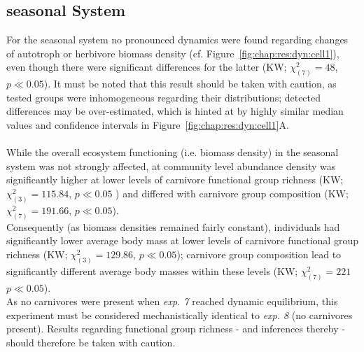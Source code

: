 \subsection{seasonal System}
\label{chap:res:popind:cell1}
 For the seasonal system no pronounced dynamics were found regarding changes of autotroph or herbivore biomass density (cf. Figure~\ref{fig:chap:res:dyn:cell1}), even though there were significant differences for the latter (KW; $\chi^{2}_{(7)} = 48$, $p \ll 0.05$). It must be noted that this result should be taken with caution, as tested groups were inhomogeneous regarding their distributions; detected differences may be over-estimated, which is hinted at by highly similar median values and confidence intervals in Figure~\ref{fig:chap:res:dyn:cell1}A.
\\\\
While the overall ecosystem functioning (i.e. biomass density) in the seasonal system was not strongly affected, at community level abundance density was significantly higher at lower levels of carnivore functional group richness (KW; $\chi^{2}_{(3)} = 115.84$, $p \ll 0.05$ ) and differed  with carnivore group composition (KW; $\chi^{2}_{(7)} = 191.66$, $p \ll 0.05$).
\\ 
Consequently (as biomass densities remained fairly constant), individuals had significantly lower average body mass at lower levels of carnivore functional group richness (KW; $\chi^{2}_{(3)} = 129.86$, $p \ll 0.05$); carnivore group composition lead to significantly different average body masses within these levels (KW; $\chi^{2}_{(7)} = 221$ $p \ll 0.05$). \\
As no carnivores were present when \textit{exp. 7} reached dynamic equilibrium, this experiment must be considered mechanistically identical to \textit{exp. 8} (no carnivores present). Results  regarding functional group richness - and inferences thereby - should therefore be taken with caution.\\\\
 
 

